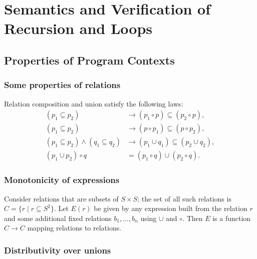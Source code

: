 % 
 
\chapter{Semantics and Verification of Recursion and Loops}
 
\section{Properties of Program Contexts}
 
\subsection*{Some properties of relations}
 
Relation composition and union satisfy the following laws:
\begin{align*}
(p_1 \subseteq p_2) &\rightarrow (p_1 \circ p) \subseteq (p_2 \circ p),\\
(p_1 \subseteq p_2) &\rightarrow (p \circ p_1) \subseteq (p \circ p_2),\\
(p_1 \subseteq p_2) \wedge (q_1 \subseteq q_2) &\rightarrow (p_1 \cup q_1) \subseteq (p_2 \cup q_2),\\
(p_1 \cup p_2) \circ q &= (p_1 \circ q) \cup (p_2 \circ q).
\end{align*}
 
\subsection*{Monotonicity of expressions}
 
Consider relations that are subsets of $S \times S$; the set of all such relations is $C = \{r \mid r \subseteq S^2\}$. Let $E(r)$ be given by any expression built from the relation $r$ and some additional fixed relations $b_1, \ldots, b_n$ using $\cup$ and $\circ$. Then $E$ is a function $C \to C$ mapping relations to relations.
 
 
 
\subsection*{Distributivity over unions}
 
